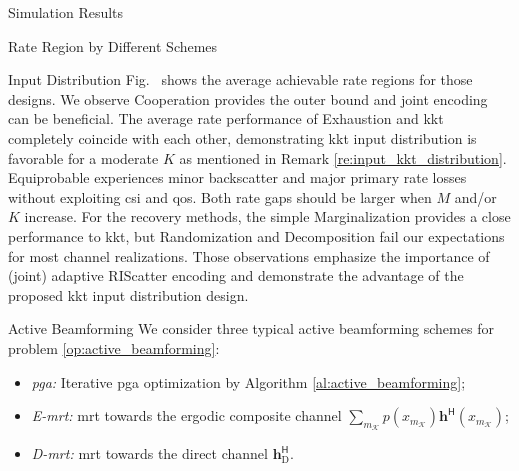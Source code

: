 \documentclass[journal]{IEEEtran}
\begin{document}
\begin{section}{Simulation Results}
\begin{subsection}{Rate Region by Different Schemes}
\begin{subsubsection}{Input Distribution}
			Fig.~ shows the average achievable rate regions for those designs.
			We observe Cooperation provides the outer bound and joint encoding can be beneficial.
			The average rate performance of Exhaustion and \gls{kkt} completely coincide with each other, demonstrating \gls{kkt} input distribution is favorable for a moderate $K$ as mentioned in Remark \ref{re:input_kkt_distribution}.
			Equiprobable experiences minor backscatter and major primary rate losses without exploiting \gls{csi} and \gls{qos}.
			Both rate gaps should be larger when $M$ and/or $K$ increase.
			For the recovery methods, the simple Marginalization provides a close performance to \gls{kkt}, but Randomization and Decomposition fail our expectations for most channel realizations.
			Those observations emphasize the importance of (joint) adaptive RIScatter encoding and demonstrate the advantage of the proposed \gls{kkt} input distribution design.
		\end{subsubsection}

		\begin{subsubsection}{Active Beamforming}
			We consider three typical active beamforming schemes for problem \eqref{op:active_beamforming}:
			\begin{itemize}
				\item \emph{\gls{pga}:} Iterative \gls{pga} optimization by Algorithm \ref{al:active_beamforming};
				\item \emph{E-\gls{mrt}:} \gls{mrt} towards the ergodic composite channel $\sum_{m_{\mathcal{K}}} p(x_{m_{\mathcal{K}}}) \boldsymbol{h}^\mathsf{H}(x_{m_{\mathcal{K}}})$;
				\item \emph{D-\gls{mrt}:} \gls{mrt} towards the direct channel $\boldsymbol{h}_{\text{D}}^\mathsf{H}$.
			\end{itemize}


\end{subsubsection}
\end{subsection}
\end{section}
\end{document}
